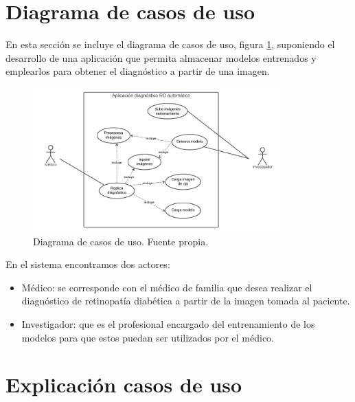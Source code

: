 
\section{Diagrama de casos de uso}

En esta sección se incluye el diagrama de casos de uso, figura \ref{fig:casosuso}, suponiendo el desarrollo de una aplicación que permita almacenar modelos entrenados y emplearlos para obtener el diagnóstico a partir de una imagen.

\begin{figure}[h]
    \centering
    \includegraphics[width=0.85\textwidth]{img/casos_uso.png}
    \caption{Diagrama de casos de uso. Fuente propia.}
    \label{fig:casosuso}
\end{figure}

En el sistema encontramos dos actores:
\begin{itemize}
    \item Médico: se corresponde con el médico de familia que desea realizar el diagnóstico de retinopatía diabética a partir de la imagen tomada al paciente.
    \item Investigador: que es el profesional encargado del entrenamiento de los modelos para que estos puedan ser utilizados por el médico.
\end{itemize}

\section{Explicación casos de uso}

